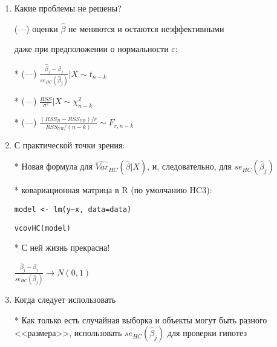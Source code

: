 \documentclass[12pt,a4paper]{article}
\begin{document}
{\begin{enumerate}
* Вместо $\widehat{Var}(\hat{\beta}|X)=\frac{RSS}{n-k}(X'X)^{-1}$ 

использовать $\widehat{Var}_{HC}(\hat{\beta}|X)=(X'X)^{-1}X'\hat{\Omega}X(X'X)^{-1}$

* Уайт, 1980, HC0: 

$\hat{\Omega}=diag( \hat{\varepsilon}_1^2, \ldots, \hat{\varepsilon}_n^2 )$

* Современный вариант, HC3: 

$\hat{\Omega}=diag \left( \frac{\hat{\varepsilon}_1^2}{(1-h_{11})^2}, \ldots, \frac{\varepsilon_n^2}{(1-h_{nn})^2} \right)$

\newpage
\newpage Суть корректировки:

Мы меняем $se(\hat{\beta}_j)$ на $se_{HC}(\hat{\beta}_j)$

Какие проблемы решены?

* $\frac{\hat{\beta}_j-\beta_j}{se_{HC}(\hat{\beta}_j)} \to N(0,1)$ (УРА!)

\item Какие проблемы не решены?

(---) оценки $\hat{\beta}$ не меняются и остаются неэффективными

даже при предположении о нормальности $\varepsilon$:

* (---) $\frac{\hat{\beta}_j-\beta_j}{se_{HC}(\hat{\beta}_j)} | X \sim t_{n-k}$

* (---) $\frac{RSS}{\sigma^2} |X \sim \chi^2_{n-k}$

* (---) $\frac{(RSS_R-RSS_{UR})/r}{RSS_{UR}/(n-k)} \sim F_{r,n-k}$

\newpage
\item С практической точки зрения:

* Новая формула для $\widehat{Var}_{HC}(\hat{\beta}|X)$, и, следовательно, для  $se_{HC}(\hat{\beta}_j)$

* ковариационная матрица в R (по умолчанию HC3):

\verb|model <- lm(y~x, data=data)|

\verb|vcovHC(model)|

* С ней жизнь прекрасна!

$\frac{\hat{\beta}_j-\beta_j}{se_{HC}(\hat{\beta}_j)} \to N(0,1)$

\item Когда следует использовать 

* Как только есть случайная выборка и объекты могут быть разного <<размера>>, использовать $se_{HC}(\hat{\beta}_j)$ для проверки гипотез


\end{enumerate}}
\end{document}
